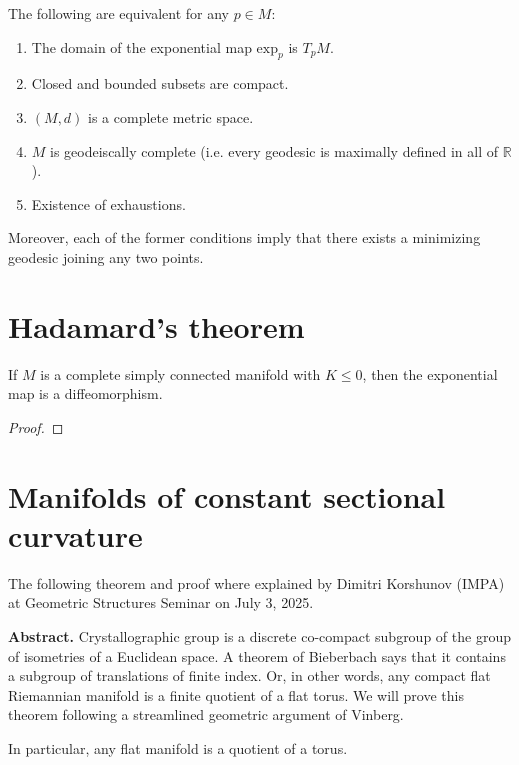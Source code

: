 \begin{theorem}
\label{theorem-Hopf-Rinow}
The following are equivalent for any $p \in M$:
\begin{enumerate}
\item The domain of the exponential map $\text{exp}_p$ is $T_pM$.
\item Closed and bounded subsets are compact.
\item $(M,d)$ is a complete metric space.
\item $M$ is geodeiscally complete (i.e. every geodesic is maximally defined in
all of $\mathbb{R}$).
\item Existence of exhaustions.
\end{enumerate}
Moreover, each of the former conditions imply that there exists a minimizing 
geodesic joining any two points.
\end{theorem}

\section{Hadamard's theorem}
\label{section-Hadamard}

\begin{theorem}[Hadamard]
\label{theorem-Hadamard}
If $M$ is a complete simply connected manifold with $K\leq 0$, then the 
exponential map is a diffeomorphism.
\end{theorem}

\begin{proof}

\end{proof}

\section{Manifolds of constant sectional curvature}
\label{section-manifolds-of-constant-sectional-curvature}

The following theorem and proof where explained by Dimitri Korshunov (IMPA) at
Geometric Structures Seminar on July 3, 2025.

{\bf Abstract.} Crystallographic group is a discrete co-compact subgroup of the
group of isometries of a Euclidean space. A theorem of Bieberbach says that it
contains a subgroup of translations of finite index. Or, in other words, any
compact flat Riemannian manifold is a finite quotient of a flat torus. We will
prove this theorem following a streamlined geometric argument of Vinberg.

\begin{theorem}[Bieberbach]
\label{theorem-Bieberbach}
In particular, any flat manifold is a quotient of a torus.
\end{theorem}

